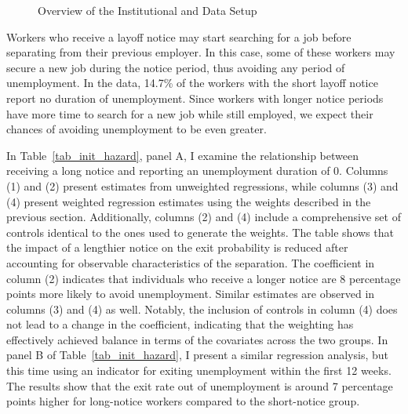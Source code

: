 \documentclass{div}
\newcommand{\NoticeOnJFinit}{7 }
\newcommand{\hOShort}{14.7}
\begin{document}
\begin{figure}[t]
\caption{Overview of the Institutional and Data Setup}\label{fig:setup}
\end{figure}

 Workers who receive a layoff notice may start searching for a job before separating from their previous employer. In this case, some of these workers may secure a new job during the notice period, thus avoiding any period of unemployment. In the data, \hOShort\% of the workers with the short layoff notice report no duration of unemployment. Since workers with longer notice periods have more time to search for a new job while still employed, we expect their chances of avoiding unemployment to be even greater.

In Table~\ref{tab_init_hazard}, panel A, I examine the relationship between receiving a long notice and reporting an unemployment duration of 0. Columns (1) and (2) present estimates from unweighted regressions, while columns (3) and (4) present weighted regression estimates using the weights described in the previous section. Additionally, columns (2) and (4) include a comprehensive set of controls identical to the ones used to generate the weights. The table shows that the impact of a lengthier notice on the exit probability is reduced after accounting for observable characteristics of the separation. The coefficient in column (2) indicates that individuals who receive a longer notice are 8 percentage points more likely to avoid unemployment. Similar estimates are observed in columns (3) and (4) as well. Notably, the inclusion of controls in column (4) does not lead to a change in the coefficient, indicating that the weighting has effectively achieved balance in terms of the covariates across the two groups. In panel B of Table~\ref{tab_init_hazard}, I present a similar regression analysis, but this time using an indicator for exiting unemployment within the first 12 weeks. The results show that the exit rate out of unemployment is around \NoticeOnJFinit percentage points higher for long-notice workers compared to the short-notice group.
\end{document}
